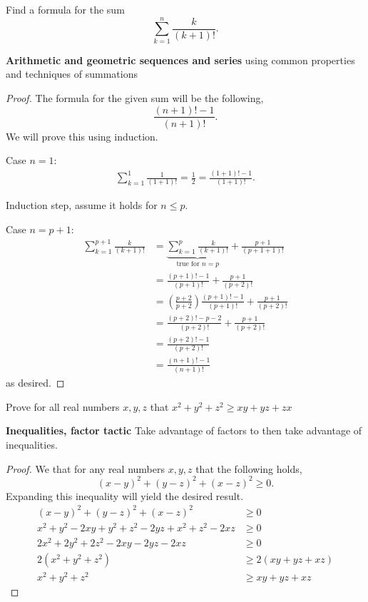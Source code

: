 \documentclass[11pt]{article}
\newenvironment{problem}[2][Problem\!]{\begin{trivlist}
\item[\hskip \labelsep {\bfseries #1}\hskip \labelsep {\bfseries #2}]}{\end{trivlist}}
\renewcommand{\geq}{\geqslant}
\renewcommand{\leq}{\leqslant}
\begin{document}
\begin{tcolorbox}
    \begin{problem} {IC - 10/22 - 81.}
        Find a formula for the sum \[\sum_{k=1}^{n}\frac{k}{(k+1)!}.\]
    \end{problem}
    \textbf{Arithmetic and geometric sequences and series} using common properties and techniques of summations
\end{tcolorbox}
\begin{proof}
    The formula for the given sum will be the following,
    \[\frac{(n+1)!-1}{(n+1)!}.\]
    We will prove this using induction.

    Case $n=1:$
    \begin{align*}
        \sum_{k=1}^{1}\frac{1}{(1+1)! } = \frac{1}{2} = \frac{(1+1)! -1}{(1+1)!}.
    \end{align*}

    Induction step, assume it holds for $n \leq p$.

    Case $n = p+1$:
    \begin{align*}
        \sum_{k =1 }^{p+1}\frac{k}{(k+1)!} &= \underbrace{\sum_{k =1}^{p}\frac{k}{(k+1)!}}_{\text{true for }n=p} + \frac{p+1}{(p+1+1)!} \\
        &= \frac{(p+1)!-1}{(p+1)!} + \frac{p+1}{(p+2)!} \\
        &= \left(\frac{p+2}{p+2}\right)\frac{(p+1)!-1}{(p+1)!} + \frac{p+1}{(p+2)!} \\
        &= \frac{(p+2)! -p -2}{(p+2)!} + \frac{p+1}{(p+2)!} \\
        &= \frac{(p+2)! -1}{(p+2)!}\\
        &= \frac{(n+1)!-1}{(n+1)!}
    \end{align*}
    as desired. 
\end{proof}



\begin{tcolorbox}
    \begin{problem} {IC - 10/27 - 99.}
        Prove for all real numbers $x,y,z$ that $x^{2} + y^{2} + z^{2} \geq xy + yz + zx$
    \end{problem}
    \textbf{Inequalities, factor tactic} Take advantage of factors to then take advantage of inequalities. 
\end{tcolorbox}
\begin{proof}
    We that for any real numbers $x,y,z$ that the following holds, \[(x-y)^{2} + (y-z)^{2} + (x-z)^{2}\geq 0.\]
    Expanding this inequality will yield the desired result.
    \begin{align*}
        (x-y)^{2} + (y-z)^{2} + (x-z)^{2}&\geq 0 \\
        x^{2} + y^{2} -2xy + y^{2} + z^{2} -2yz + x^{2} + z^{2} -2xz &\geq 0 \\
        2x^{2} + 2y^{2} + 2z^{2} -2xy -2yz -2xz &\geq 0 \\
        2(x^{2} + y^{2} + z^{2}) &\geq 2(xy + yz + xz) \\
        x^{2} + y^{2} + z^{2} &\geq xy + yz + xz
    \end{align*}
\end{proof}
\end{document}

